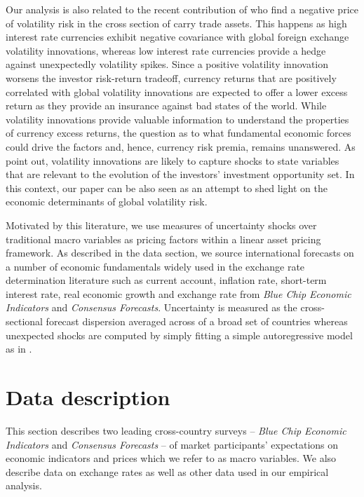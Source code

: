 Our analysis is also related to the recent contribution of \citet{menkhoff_etal2012} who find a negative price of volatility risk in the cross section of carry trade assets. This happens as high interest rate currencies exhibit negative covariance with global foreign exchange volatility innovations, whereas low interest rate currencies provide a hedge against unexpectedly volatility spikes. Since a positive volatility innovation worsens the investor risk-return tradeoff, currency returns that are positively correlated with global volatility innovations are expected to offer a lower excess return as they provide an insurance against bad states of the world. While volatility innovations provide valuable information to understand the properties of currency excess returns, the question as to what fundamental economic forces could drive the factors and, hence, currency risk premia, remains unanswered. As \citet{menkhoff_etal2012} point out, volatility innovations are likely to capture shocks to state variables that are relevant to the evolution of the investors' investment opportunity set. In this context, our paper can be also seen as an attempt to shed light on the economic determinants of global volatility risk.


Motivated by this literature, we use measures of uncertainty shocks over traditional macro variables as pricing factors within a linear asset pricing framework. As described in the data section, we source international forecasts on a number of economic fundamentals widely used in the exchange rate determination literature such as current account, inflation rate, short-term interest rate, real economic growth and exchange rate from \emph{Blue Chip Economic Indicators} and \emph{Consensus Forecasts}. Uncertainty is measured as the cross-sectional forecast dispersion averaged across of a broad set of countries whereas unexpected shocks are computed by simply fitting a simple autoregressive model as in \citet{menkhoff_etal2012}.

\section{Data description} \label{sec:data_UNC_CAR}
This section describes two leading cross-country surveys -- \emph{Blue Chip Economic Indicators} and \emph{Consensus Forecasts} -- of market participants' expectations on economic indicators and prices which we refer to as macro variables. We also describe data on exchange rates as well as other data used in our empirical analysis.

